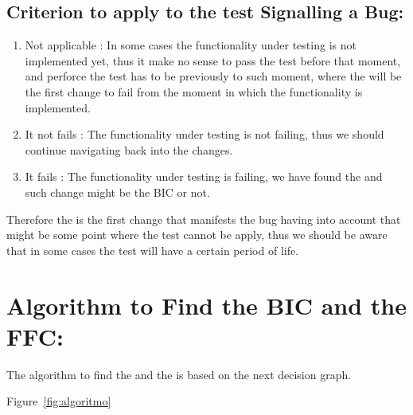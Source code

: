 \documentclass[a4paper, 12pt]{book}
\begin{document}
\subsection{Criterion to apply to the test Signalling a Bug:}
 \begin{enumerate}
	\item Not applicable : In some cases the functionality under testing is not implemented yet, thus it make no sense to pass the test before that moment, and perforce the test has to be previously to such moment, where the \FFC will be the first change to fail from the moment in which the functionality is implemented.
	\item It not fails : The functionality under testing is not failing, thus we should continue navigating back into the changes.
	\item It fails : The functionality under testing is failing, we have found the \FFC and such change might be the BIC or not.
\end{enumerate}

Therefore the \FFC is the first change that manifests the bug having into account that might be some point where the test cannot be apply, thus we should be aware that in some cases the test will have a certain period of life.

\section{Algorithm to Find the BIC and the FFC:}
The algorithm to find the \BIC and the \FFC is based on the next decision graph.

Figure~\ref{fig:algoritmo} 
\end{document}
